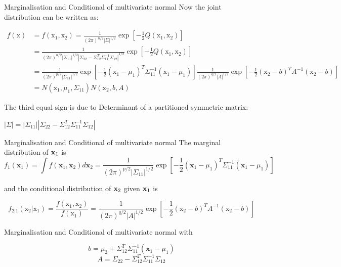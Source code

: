 \documentclass{beamer}
\begin{document}
\begin{frame}{Marginalisation and Conditional of multivariate normal}
	Now the joint distribution can be written as: 
	
	$$\begin{aligned} f(\mathrm{x}) &=f\left(\mathrm{x}_{1}, \mathrm{x}_{2}\right)=\frac{1}{(2 \pi)^{n / 2}\vert\Sigma\vert^{1 / 2}} \exp \left[-\frac{1}{2} Q\left(\mathrm{x}_{1}, \mathrm{x}_{2}\right)\right] \\ &=\frac{1}{(2 \pi)^{n / 2}\left|\Sigma_{11}\right|^{1 / 2}\left|\Sigma_{22}-\Sigma_{12}^{T} \Sigma_{11}^{-1} \Sigma_{12}\right|^{1 / 2}} \exp \left[-\frac{1}{2} Q\left(\mathrm{x}_{1}, \mathrm{x}_{2}\right)\right] \\ &=\frac{1}{(2 \pi)^{p / 2}\left|\Sigma_{11}\right|^{1 / 2}} \exp \left[-\frac{1}{2}\left(\mathrm{x}_{1}-\mu_{1}\right)^{T} \Sigma_{11}^{-1}\left(\mathrm{x}_{1}-\mu_{1}\right)\right] \frac{1}{(2 \pi)^{q / 2}|A|^{1 / 2}} \exp \left[-\frac{1}{2}\left(\mathrm{x}_{2}-b\right)^{T} A^{-1}\left(\mathrm{x}_{2}-b\right)\right] \\ &=N\left(\mathrm{x}_{1}, \mu_{1}, \Sigma_{11}\right) N\left(\mathrm{x}_{2}, b, A\right) \end{aligned}$$
	
	The third equal sign is due to Determinant of a partitioned symmetric matrix:
	
	$|\Sigma|=\left|\Sigma_{11}\right|\left|\Sigma_{22}-\Sigma_{12}^{T} \Sigma_{11}^{-1} \Sigma_{12}\right|$
\end{frame}

\begin{frame}{Marginalisation and Conditional of multivariate normal}
	The marginal distribution of ${\bf x}_1$ is 
	$$f_{1}\left(\mathbf{x}_{1}\right)=\int f\left(\mathbf{x}_{1}, \mathbf{x}_{2}\right) d \mathbf{x}_{2}=\frac{1}{(2 \pi)^{p / 2}\left|\Sigma_{11}\right|^{1 / 2}} \exp \left[-\frac{1}{2}\left(\mathbf{x}_{1}-\mu_{1}\right)^{T} \Sigma_{11}^{-1}\left(\mathbf{x}_{1}-\mu_{1}\right)\right]$$
	
	and the conditional distribution of ${\bf x}_2$ given ${\bf x}_1$ is 
	
	$$f_{2 | 1}\left(\mathrm{x}_{2} | \mathrm{x}_{1}\right)=\frac{f\left(\mathrm{x}_{1}, \mathrm{x}_{2}\right)}{f\left(\mathrm{x}_{1}\right)}=\frac{1}{(2 \pi)^{q / 2}|A|^{1 / 2}} \exp \left[-\frac{1}{2}\left(\mathrm{x}_{2}-b\right)^{T} A^{-1}\left(\mathrm{x}_{2}-b\right)\right]$$
\end{frame}

\begin{frame}{Marginalisation and Conditional of multivariate normal}
	with
	
	$$b=\mu_{2}+\Sigma_{12}^{T} \Sigma_{11}^{-1}\left(\mathbf{x}_{1}-\mu_{1}\right)$$
	\[
	A=\Sigma_{22}-\Sigma_{12}^{T} \Sigma_{11}^{-1} \Sigma_{12}
	\]
\end{frame}


%
%
\end{document}
